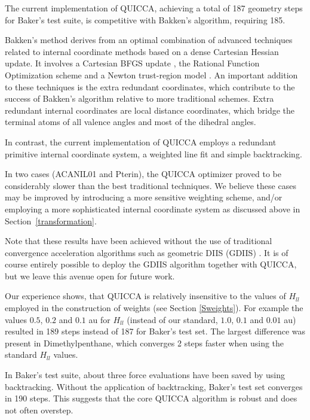 \documentclass[prl,twocolumn,showpacs,twocolumngrid,superbib]{revtex4}
\begin{document}
The current implementation of QUICCA, achieving a total of 187 geometry steps for Baker's test suite, is 
competitive with Bakken's algorithm, requiring 185.  

Bakken's method \cite{bakken} derives from an optimal combination of advanced techniques
related to internal coordinate methods based on a dense Cartesian Hessian update. It involves 
a Cartesian BFGS update \cite{RFletcher}, the Rational Function Optimization scheme \cite{benerji_RFO} 
and a Newton trust-region model \cite{RFletcher}. An important addition to these techniques is the 
extra redundant coordinates, which contribute to the success of Bakken's algorithm relative to more 
traditional schemes. Extra redundant internal coordinates are local distance coordinates, which bridge 
the terminal atoms of all valence angles and most of the dihedral angles.

In contrast, the current implementation of QUICCA employs a redundant primitive internal coordinate 
system, a weighted line fit and simple backtracking.  

In two cases (ACANIL01 and Pterin), the QUICCA optimizer proved to be considerably slower 
than the best traditional techniques.   We believe these cases may be improved by introducing a
more sensitive weighting scheme, and/or employing a more sophisticated internal coordinate
system as discussed above in Section~\ref{transformation}.

Note that these results have been achieved without the use of traditional convergence acceleration 
algorithms such as geometric DIIS (GDIIS) \cite{Pulay_GDIIS,Farkas_GDIIS}.  It is of course entirely 
possible to deploy the GDIIS algorithm together with QUICCA, but we leave this avenue open for future 
work.

Our experience shows, that QUICCA is relatively insensitive to the values of $H_{ll}$ employed 
in the construction of weights (see Section \ref{Sweights}).   For example the values $0.5$, $0.2$ 
and $0.1$ au for $H_{ll}$ (instead of our standard, $1.0$, $0.1$ and $0.01$ au)
resulted in 189 steps instead of 187 for Baker's test set.  The largest difference was present 
in Dimethylpenthane, which converges 2 steps faster when using the standard $H_{ll}$ values. 

In  Baker's test suite, about three force evaluations have been saved by 
using backtracking. Without the application of backtracking, Baker's test set
converges in 190 steps.  This suggests that the core QUICCA algorithm is robust and
does not often overstep.  
\end{document}
